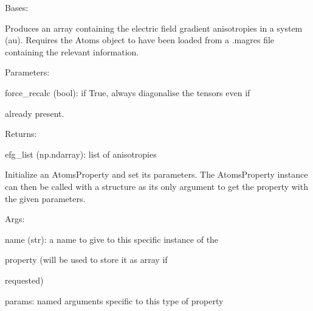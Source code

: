\documentclass[letterpaper,10pt,english]{sphinxmanual}
\begin{document}
\begin{fulllineitems}
\label{doctree/soprano.properties.nmr.efg:soprano.properties.nmr.efg.EFGAnisotropy}
Bases: {\hyperref[doctree/soprano.properties.atomsproperty:soprano.properties.atomsproperty.AtomsProperty]{\emph{}}}

Produces an array containing the electric field gradient anisotropies in a
system (au).
Requires the Atoms object to have been loaded from a .magres file
containing the relevant information.

\begin{DUlineblock}{0em}
\item[] Parameters:
\item[]
\begin{DUlineblock}{\DUlineblockindent}
\item[] force\_recalc (bool): if True, always diagonalise the tensors even if
\item[]
\begin{DUlineblock}{\DUlineblockindent}
\item[] already present.
\end{DUlineblock}
\end{DUlineblock}
\end{DUlineblock}

\begin{DUlineblock}{0em}
\item[] Returns:
\item[]
\begin{DUlineblock}{\DUlineblockindent}
\item[] efg\_list (np.ndarray): list of anisotropies
\end{DUlineblock}
\end{DUlineblock}

Initialize an AtomsProperty and set its parameters.
The AtomsProperty instance can then be called with a structure as its
only argument to get the property with the given parameters.

\begin{DUlineblock}{0em}
\item[] Args:
\item[]
\begin{DUlineblock}{\DUlineblockindent}
\item[] name (str): a name to give to this specific instance of the
\item[]
\begin{DUlineblock}{\DUlineblockindent}
\item[] property (will be used to store it as array if
\item[] requested)
\end{DUlineblock}
\item[] params: named arguments specific to this type of property
\end{DUlineblock}
\end{DUlineblock}


\end{fulllineitems}
\end{document}
